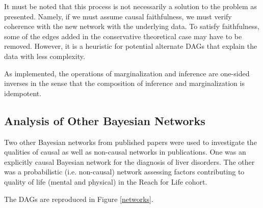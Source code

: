 \documentclass{article}
\begin{document}
	It must be noted that this process is not necessarily a solution to the problem as presented.
	Namely, if we must assume causal faithfulness, we must verify coherence with the new network with the underlying data.
	To satisfy faithfulness, some of the edges added in the conservative theoretical case may have to be removed.
	However, it is a heuristic for potential alternate DAGs that explain the data with less complexity.
	
	As implemented, the operations of marginalization and inference are one-sided inverses in the sense that the composition of inference and marginalization is idempotent.
	
	\subsection{Analysis of Other Bayesian Networks}
	
	Two other Bayesian networks from published papers were used to investigate the qualities of causal as well as non-causal networks in publications.
	One was an explicitly causal Bayesian network for the diagnosis of liver disorders\cite{liverDisorders}.
	The other was a probabilistic (i.e. non-causal) network assessing factors contributing to quality of life (mental and physical) in the Reach for Life cohort\cite{Xu2018}.
	
	The DAGs are reproduced in Figure \ref{networks}.
	
\end{document}
